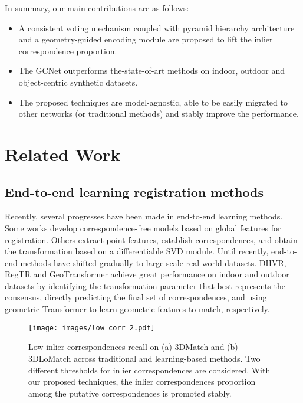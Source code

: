 \documentclass[10pt,twocolumn,letterpaper]{article}
\begin{document}
In summary, our main contributions are as follows:
\vspace{-0.5em}
\begin{itemize}
\setlength{\itemsep}{0.25pt}
\setlength{\parsep}{0pt}
\setlength{\parskip}{0pt}
\item A consistent voting mechanism coupled with pyramid hierarchy architecture and a geometry-guided encoding module are proposed to lift the inlier correspondence proportion.
\item The GCNet outperforms the-state-of-art methods on indoor, outdoor and object-centric synthetic datasets.
\item The proposed techniques are model-agnostic, able to be easily migrated to other networks (or traditional methods) and stably improve the performance.
\end{itemize}

\vspace{-1.25em}
\section{Related Work}
\vspace{-.25em}
\subsection{End-to-end learning registration methods}
Recently, several progresses have been made in end-to-end learning methods. Some works \cite{aoki2019pointnetlk,sarode2019pcrnet,huang2020feature,xu2021omnet,xu2021finet} develop correspondence-free models based on global features for registration. Others\cite{wang2019deep,wang2019prnet,yew2020rpm,fu2021robust,zhu2021point} extract point features, establish correspondences, and obtain the transformation based on a differentiable SVD module. Until recently, end-to-end methods have shifted gradually to large-scale real-world datasets.  DHVR\cite{lee2021deep}, RegTR\cite{yew2022regtr} and  GeoTransformer\cite{qin2022geometric} achieve great performance on indoor and outdoor datasets by identifying the transformation parameter that best represents the consensus, directly predicting the final set of correspondences, and using geometric Transformer to learn geometric features to match, respectively. 

\begin{figure}[!t]
\centering
\vspace{-0.7em}
\texttt{[image: images/low\_corr\_2.pdf]}
\vspace{-2.5em}
\caption{Low inlier correspondences recall on (a) 3DMatch and (b) 3DLoMatch across traditional and learning-based methods. Two different thresholds for inlier correspondences are considered. With our proposed techniques, the inlier correspondences proportion among the putative correspondences is promoted stably.} 
\label{fig:intro}
\vspace{-1.75em}
\end{figure}
\end{document}
